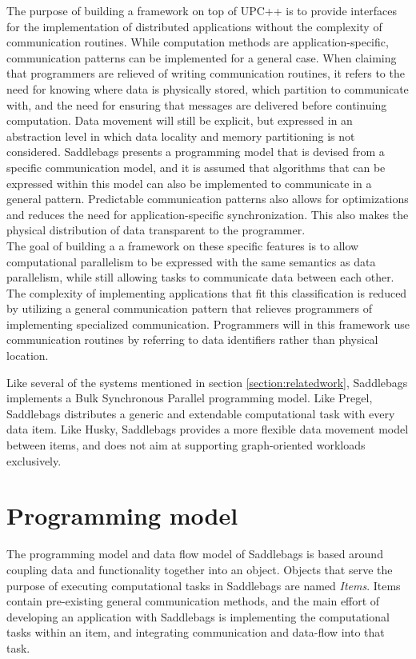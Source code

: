 \documentclass{uit-report}
\begin{document}
The purpose of building a framework on top of UPC++ is to provide interfaces for the implementation of distributed applications without the complexity of communication routines. While computation methods are application-specific, communication patterns can be implemented for a general case. When claiming that programmers are relieved of writing communication routines, it refers to the need for knowing where data is physically stored, which partition to communicate with, and the need for ensuring that messages are delivered before continuing computation. Data movement will still be explicit, but expressed in an abstraction level in which data locality and memory partitioning is not considered. Saddlebags presents a programming model that is devised from a specific communication model, and it is assumed that algorithms that can be expressed within this model can also be implemented to communicate in a general pattern. Predictable communication patterns also allows for optimizations and reduces the need for application-specific synchronization. This also makes the physical distribution of data transparent to the programmer.
\\

The goal of building a a framework on these specific features is to allow computational parallelism to be expressed with the same semantics as data parallelism, while still allowing tasks to communicate data between each other. The complexity of implementing applications that fit this classification is reduced by utilizing a general communication pattern that relieves programmers of implementing specialized communication. Programmers will in this framework use communication routines by referring to data identifiers rather than physical location.

Like several of the systems mentioned in section \ref{section:relatedwork}, Saddlebags implements a Bulk Synchronous Parallel programming model. Like Pregel, Saddlebags distributes a generic and extendable computational task with every data item. Like Husky, Saddlebags provides a more flexible data movement model between items, and does not aim at supporting graph-oriented workloads exclusively.

\section{Programming model}
The programming model and data flow model of Saddlebags is based around coupling data and functionality together into an object. Objects that serve the purpose of executing computational tasks in Saddlebags are named \emph{Items}. Items contain pre-existing general communication methods, and the main effort of developing an application with Saddlebags is implementing the computational tasks within an item, and integrating communication and data-flow into that task.
\end{document}
